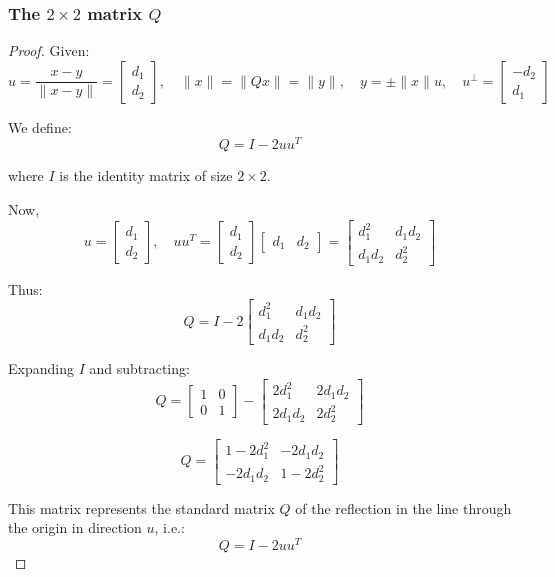\documentclass[12pt]{article}
\begin{document}
\subsubsection{The $2\times2$ matrix $Q$}
\begin{proof}
Given:
\[
u = \frac{x - y}{\|x - y\|} = \begin{bmatrix} d_1 \\ d_2 \end{bmatrix}, \quad \|x\| = \|Qx\| = \|y\|, \quad y = \pm \|x\|u, \quad
u^{\bot} = \begin{bmatrix} -d_2 \\ d_1 \end{bmatrix}
\]

We define:
\[
Q = I - 2uu^T
\]

where \( I \) is the identity matrix of size \( 2 \times 2 \). 

Now,
\[
u = \begin{bmatrix} d_1 \\ d_2 \end{bmatrix}, \quad uu^T = \begin{bmatrix} d_1 \\ d_2 \end{bmatrix} \begin{bmatrix} d_1 & d_2 \end{bmatrix} = \begin{bmatrix} d_1^2 & d_1 d_2 \\ d_1 d_2 & d_2^2 \end{bmatrix}
\]

Thus:
\[
Q = I - 2 \begin{bmatrix} d_1^2 & d_1 d_2 \\ d_1 d_2 & d_2^2 \end{bmatrix}
\]

Expanding \( I \) and subtracting:
\[
Q = \begin{bmatrix} 1 & 0 \\ 0 & 1 \end{bmatrix} - \begin{bmatrix} 2d_1^2 & 2d_1 d_2 \\ 2d_1 d_2 & 2d_2^2 \end{bmatrix}
\]

\[
Q = \begin{bmatrix} 1 - 2d_1^2 & -2d_1 d_2 \\ -2d_1 d_2 & 1 - 2d_2^2 \end{bmatrix}
\]

This matrix represents the standard matrix \( Q \) of the reflection in the line through the origin in direction \( u \), i.e.:
\[
Q = I - 2uu^T
\]
\end{proof}
\end{document}
